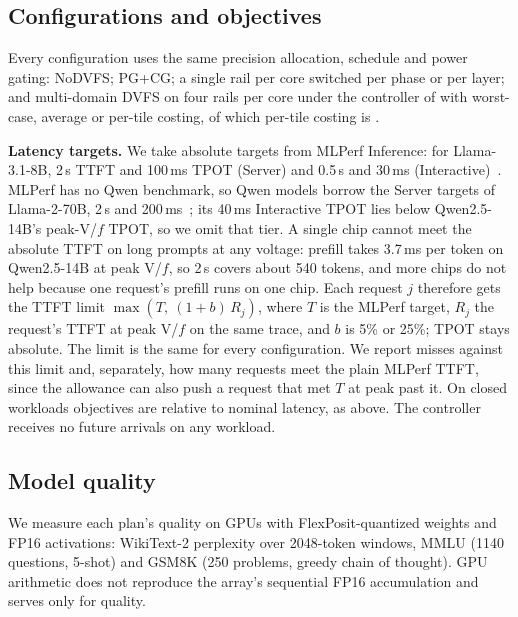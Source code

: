 \subsection{Configurations and objectives}
Every configuration uses the same precision allocation, schedule and power gating: NoDVFS; PG+CG; a single rail per core switched per phase or per layer; and multi-domain DVFS on four rails per core under the controller of  with worst-case, average or per-tile costing, of which per-tile costing is \sys{}.


\textbf{Latency targets.} We take absolute targets from MLPerf Inference: for Llama-3.1-8B, 2\,s TTFT and 100\,ms TPOT (Server) and 0.5\,s and 30\,ms (Interactive)~\cite{mlperf_llama31}. MLPerf has no Qwen benchmark, so Qwen models borrow the Server targets of Llama-2-70B, 2\,s and 200\,ms~\cite{mlperf_llama270b}; its 40\,ms Interactive TPOT lies below Qwen2.5-14B's peak-V/$f$ TPOT, so we omit that tier.
A single chip cannot meet the absolute TTFT on long prompts at any voltage: prefill takes 3.7\,ms per token on Qwen2.5-14B at peak V/$f$, so 2\,s covers about 540 tokens, and more chips do not help because one request's prefill runs on one chip. Each request $j$ therefore gets the TTFT limit $\max(T,\ (1+b)\,R_j)$, where $T$ is the MLPerf target, $R_j$ the request's TTFT at peak V/$f$ on the same trace, and $b$ is 5\% or 25\%; TPOT stays absolute. The limit is the same for every configuration. We report misses against this limit and, separately, how many requests meet the plain MLPerf TTFT, since the allowance can also push a request that met $T$ at peak past it.
On closed workloads objectives are relative to nominal latency, as above. The controller receives no future arrivals on any workload.

\subsection{Model quality}
We measure each plan's quality on GPUs with FlexPosit-quantized weights and FP16 activations: WikiText-2 perplexity over 2048-token windows, MMLU (1140 questions, 5-shot) and GSM8K (250 problems, greedy chain of thought).
GPU arithmetic does not reproduce the array's sequential FP16 accumulation and serves only for quality.
